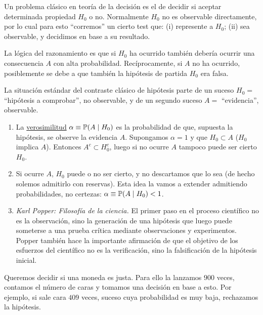 Un problema clásico en teoría de la decisión es el de decidir si aceptar determinada propiedad $H_0$ o no. Normalmente $H_0$ no es observable directamente, por lo cual para esto ``corremos'' un cierto test que: (i) represente a $H_0$; (ii) sea observable, y decidimos en base a su resultado.

La lógica del razonamiento es que si $H_0$ ha ocurrido también debería ocurrir una consecuencia $A$ con alta probabilidad. Recíprocamente, si $A$ no ha ocurrido, posiblemente se debe a que también la hipótesis de partida $H_0$ era falsa.

La situación estándar del contraste clásico de hipótesis parte de un suceso $H_0 =$ ``hipótesis a comprobar'', no observable, y de un segundo suceso $A =$ ``evidencia'', observable.

\begin{observacion}[36]
\begin{enumerate}
  \item La \underline{verosimilitud} $\alpha \equiv \mathbb{P}(A \mid H_0)$ es la probabilidad de que, supuesta la hipótesis, se observe la evidencia $A$. Supongamos $\alpha = 1$ y que $H_0 \subset A$ ($H_0$ implica $A$). Entonces $A^c \subset H_0^c$, luego si no ocurre $A$ tampoco puede ser cierto $H_0$.
  \item Si ocurre $A$, $H_0$ puede o no ser cierto, y no descartamos que lo sea (de hecho solemos admitirlo con reservas). Esta idea la vamos a extender admitiendo probabilidades, no certezas: $\alpha \equiv \mathbb{P}(A \mid H_0) < 1$.
  \item \textcolor{azulresalt}{\emph{Karl Popper: Filosofía de la ciencia.} El primer paso en el proceso científico no es la observación, sino la generación de una hipótesis que luego puede someterse a una prueba crítica mediante observaciones y experimentos. Popper también hace la importante afirmación de que el objetivo de los esfuerzos del científico no es la verificación, sino la falsificación de la hipótesis inicial.}
\end{enumerate}
\end{observacion}

\begin{ejemplo}[28]
Queremos decidir si una moneda es justa. Para ello la lanzamos $900$ veces, contamos el número de caras y tomamos una decisión en base a esto. Por ejemplo, si sale cara $409$ veces, suceso cuya probabilidad es muy baja, rechazamos la hipótesis.
\end{ejemplo}

